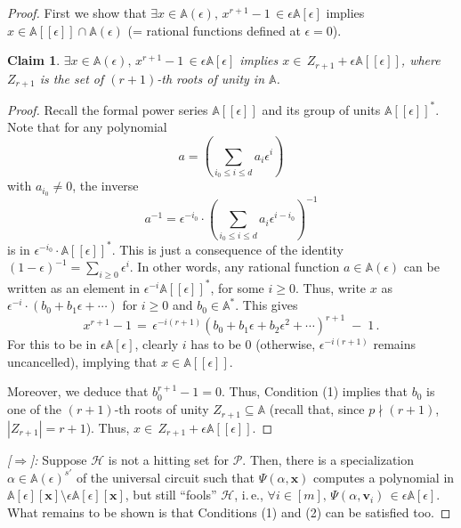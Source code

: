 \documentclass[11pt]{article}
\numberwithin{equation}{section}
\newtheorem{claim}[theorem]{Claim}
\theoremstyle{definition}
\theoremstyle{plain}
\newcommand{\ie}{i.\,e.}
\newcommand{\calH}{\mathcal{H}}
\newcommand{\calP}{\mathcal{P}}
\newcommand{\aff}{\mathbb{A}}
\begin{document}
\begin{proof}
%
First we show that %
$\exists x\in \aff(\epsilon),\, {x}^{r+1}- 1 \,\in \epsilon\aff[\epsilon]$ implies $x\in \aff[[\epsilon]]\cap \aff(\epsilon)$ (= rational functions defined at $\epsilon=0$).

\begin{claim}\label{defined at zero}
  $\exists x\in \aff(\epsilon),\, {x}^{r+1}- 1 \,\in \epsilon\aff[\epsilon]$ implies $x\in \, Z_{r+1} + \epsilon\aff[[\epsilon]]$, where 
  $Z_{r+1}$ is the set of $(r+1)$-th roots of unity in $\aff$. 
\end{claim}

 \begin{proof}

Recall the formal power series $\aff[[\epsilon]]$ and its group of units $\aff[[\epsilon]]^*$.
Note that for any polynomial
\[
  a=\left(\sum_{i_0\le i\le d} a_i\epsilon^i\right)
\]
with $a_{i_0}\ne0$, the inverse
\[
  a^{-1} = \epsilon^{-i_0}\cdot \left(\sum_{i_0\le i\le d}
  a_i\epsilon^{i-i_0}\right)^{-1}
\]
is in $\epsilon^{-i_0}\cdot \aff[[\epsilon]]^*$. This is just a
consequence of the identity
$(1-\epsilon)^{-1} = \sum_{i\ge0} \epsilon^i$. In other words, any
rational function $a\in \aff(\epsilon)$ can be written as an element
in $\epsilon^{-i}\aff[[\epsilon]]^*$, for some $i\ge0$. Thus, write
$x$ as $\epsilon^{-i}\cdot(b_0+b_1\epsilon+\cdots)$ for $i\ge0$ and
$b_0\in\aff^*$. This gives
$${x}^{r+1}- 1 \,=\, \epsilon^{-i(r+1)}(b_0+b_1\epsilon+ b_2\epsilon^{2} +\cdots)^{r+1} \;-\; 1 \,.$$
For this to be in $\epsilon\aff[\epsilon]$, clearly $i$ has to be $0$ (otherwise, $\epsilon^{-i(r+1)}$ remains 
%
uncancelled), %
implying that $x\in \aff[[\epsilon]]$. 

Moreover, we deduce that $b_0^{r+1} - 1 = 0$. Thus, 
%
Condition (1) %
implies that $b_0$ is one of the $(r+1)$-th roots of unity $Z_{r+1}\subseteq\aff$ (recall that, since $p\nmid(r+1)$, $|Z_{r+1}|=r+1$). Thus, $x\in \, Z_{r+1} + \epsilon\aff[[\epsilon]]$.
\end{proof}

\smallskip\emph{[$\Rightarrow$]:}
Suppose $\mathcal{H}$ is not a hitting set for $\calP$. Then, there is a specialization $\alpha \in \aff(\epsilon)^{s'}$ of the universal circuit such that $\Psi(\alpha, \mathbf x)$ computes a polynomial in $\aff[\epsilon][\mathbf x]\setminus \epsilon\aff[\epsilon][\mathbf x]$, but still ``fools'' $\calH$, \ie, $\forall i \in [m],\, \Psi(\alpha,\mathbf{v}_i) \,\in \epsilon\aff[\epsilon]$. 
What remains to be shown is that 
%
Conditions %
(1) and (2) 
can be satisfied too.


\end{proof}
\end{document}
